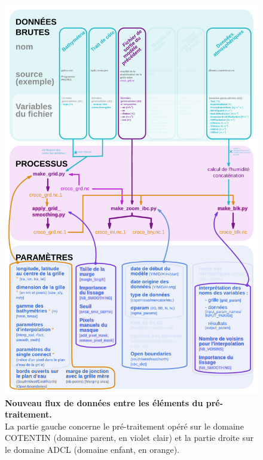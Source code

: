 \documentclass[10pt,a4paper,titlepage]{article}
\begin{document}
\begin{figure}[H]
\begin{center}
        \includegraphics[scale=0.35]{../images/workflow/graphe_prepro_fille_new.pdf}
        \caption{
            \textbf{
            Nouveau flux de données entre les éléments du pré-traitement.
            }
        \\
            La partie gauche concerne le pré-traitement opéré sur le domaine COTENTIN ({\color{workColor}domaine parent, en violet clair}) et la partie droite sur le domaine ADCL ({\color{orange}domaine enfant, en orange}).
}
\end{center}
\end{figure}
\end{document}
